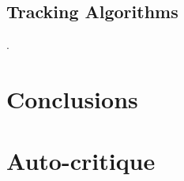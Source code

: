 \documentclass[pdftex,12pt,a4paper]{report}
\begin{document}
\section{Tracking Algorithms}
\label{sec:discussion_tracking_algs}.

\chapter{Conclusions}
\label{chap:conclusion}

\chapter*{Auto-critique}

\printbibliography[title={References}]

\end{document}
